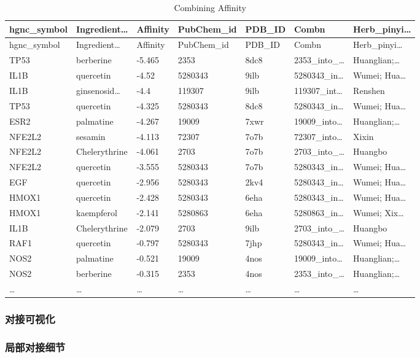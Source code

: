 \documentclass[
]{article}
\begin{document}
\begin{longtable}[]{@{}lllllll@{}}
\caption{\label{tab:Combining-Affinity}Combining Affinity}\tabularnewline
\toprule
hgnc\_symbol & Ingredient\ldots{} & Affinity & PubChem\_id & PDB\_ID & Combn & Herb\_pinyi\ldots{}\tabularnewline
\midrule
\endfirsthead
\toprule
hgnc\_symbol & Ingredient\ldots{} & Affinity & PubChem\_id & PDB\_ID & Combn & Herb\_pinyi\ldots{}\tabularnewline
\midrule
\endhead
TP53 & berberine & -5.465 & 2353 & 8dc8 & 2353\_into\_\ldots{} & Huanglian;\ldots{}\tabularnewline
IL1B & quercetin & -4.52 & 5280343 & 9ilb & 5280343\_in\ldots{} & Wumei; Hua\ldots{}\tabularnewline
IL1B & ginsenosid\ldots{} & -4.4 & 119307 & 9ilb & 119307\_int\ldots{} & Renshen\tabularnewline
TP53 & quercetin & -4.325 & 5280343 & 8dc8 & 5280343\_in\ldots{} & Wumei; Hua\ldots{}\tabularnewline
ESR2 & palmatine & -4.267 & 19009 & 7xwr & 19009\_into\ldots{} & Huanglian;\ldots{}\tabularnewline
NFE2L2 & sesamin & -4.113 & 72307 & 7o7b & 72307\_into\ldots{} & Xixin\tabularnewline
NFE2L2 & Chelerythrine & -4.061 & 2703 & 7o7b & 2703\_into\_\ldots{} & Huangbo\tabularnewline
NFE2L2 & quercetin & -3.555 & 5280343 & 7o7b & 5280343\_in\ldots{} & Wumei; Hua\ldots{}\tabularnewline
EGF & quercetin & -2.956 & 5280343 & 2kv4 & 5280343\_in\ldots{} & Wumei; Hua\ldots{}\tabularnewline
HMOX1 & quercetin & -2.428 & 5280343 & 6eha & 5280343\_in\ldots{} & Wumei; Hua\ldots{}\tabularnewline
HMOX1 & kaempferol & -2.141 & 5280863 & 6eha & 5280863\_in\ldots{} & Wumei; Xix\ldots{}\tabularnewline
IL1B & Chelerythrine & -2.079 & 2703 & 9ilb & 2703\_into\_\ldots{} & Huangbo\tabularnewline
RAF1 & quercetin & -0.797 & 5280343 & 7jhp & 5280343\_in\ldots{} & Wumei; Hua\ldots{}\tabularnewline
NOS2 & palmatine & -0.521 & 19009 & 4nos & 19009\_into\ldots{} & Huanglian;\ldots{}\tabularnewline
NOS2 & berberine & -0.315 & 2353 & 4nos & 2353\_into\_\ldots{} & Huanglian;\ldots{}\tabularnewline
\ldots{} & \ldots{} & \ldots{} & \ldots{} & \ldots{} & \ldots{} & \ldots{}\tabularnewline
\bottomrule
\end{longtable}

\hypertarget{ux5bf9ux63a5ux53efux89c6ux5316}{%
\subsubsection{对接可视化}\label{ux5bf9ux63a5ux53efux89c6ux5316}}

\hypertarget{ux5c40ux90e8ux5bf9ux63a5ux7ec6ux8282}{%
\subsubsection{局部对接细节}\label{ux5c40ux90e8ux5bf9ux63a5ux7ec6ux8282}}
\end{document}
